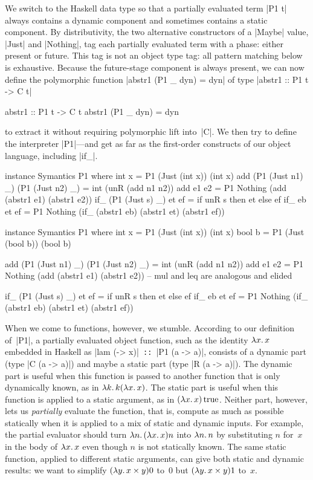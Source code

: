 We switch to the Haskell data type
\ifshort {} \else {} \fi
so that a partially evaluated term |P1 t| always contains a dynamic
component and sometimes contains a static component.  By 
distributivity, the two
alternative constructors of a |Maybe| value, |Just| and |Nothing|,
tag each partially evaluated term with a phase: either present or
future.  This tag is not an object type tag: all pattern matching below
is exhaustive.  Because the future-stage component is always present, we
can now define the polymorphic function
\ifshort
|abstr1 (P1 _ dyn) = dyn| of type
|abstr1 :: P1 t -> C t|
\else
\begin{code}
abstr1 :: P1 t -> C t
abstr1 (P1 _ dyn) = dyn
\end{code}
\fi
to extract it without requiring polymorphic lift into~|C|.  We then try
to define the interpreter |P1|---and get as far as the first-order
constructs of our object language, including |if_|.
\ifshort
\vspace*{-0.7em}
\begin{code3}
instance Symantics P1 where
  int x = P1 (Just (int x)) (int x)
  add (P1 (Just n1) _) (P1 (Just n2) _) = int (unR (add n1 n2))
  add e1 e2 = P1 Nothing (add (abstr1 e1) (abstr1 e2))
  if_ (P1 (Just s) _) et ef = if unR s then et else ef
  if_ eb et ef = P1 Nothing (if_ (abstr1 eb) (abstr1 et) (abstr1 ef))
\end{code3}
\vspace*{-0.7em}
\else
\begin{code}
instance Symantics P1 where
  int  x = P1 (Just (int  x)) (int  x)
  bool b = P1 (Just (bool b)) (bool b)

  add (P1 (Just n1) _) (P1 (Just n2) _) = int (unR (add n1 n2))
  add e1 e2 = P1 Nothing (add (abstr1 e1) (abstr1 e2))
  -- mul and leq are analogous and elided

  if_ (P1 (Just s) _) et ef = if unR s then et else ef
  if_ eb et ef = P1 Nothing
                    (if_ (abstr1 eb) (abstr1 et) (abstr1 ef))
\end{code}
\fi
When we come to functions, however, we stumble.  According to our
definition of~|P1|, a partially evaluated object function, such as the
identity $\mathopen{\lambda\mathord{x}.\,}x$ embedded in Haskell as |lam (\x -> x)|\texttt{ ::
}|P1 (a -> a)|, consists of a dynamic part (type |C (a -> a)|) and
maybe a static part (type |R (a -> a)|).  The dynamic part is useful
when this function is passed to another function that is only
dynamically known, as in $\mathopen{\lambda\mathord{k}.\,}k(\mathopen{\lambda\mathord{x}.\,}x)$.  The static part is
useful when this function is applied to a static argument, as in
$(\mathopen{\lambda\mathord{x}.\,}x)\mathinner{\mathrm{true}}$.  Neither part, however, lets us \emph{partially}
evaluate the function, that is, compute as much as possible statically
when it is applied to a mix of static and dynamic inputs.  For example,
the partial evaluator should turn $\mathopen{\lambda\mathord{n}.\,}(\mathopen{\lambda\mathord{x}.\,}x)n$ into $\mathopen{\lambda\mathord{n}.\,}n$
by substituting $n$ for~$x$ in the body of $\mathopen{\lambda\mathord{x}.\,}x$ even though $n$ is
not statically known.  The same static function, applied to
different static arguments, can give both static and dynamic results: we
want to simplify $(\mathopen{\lambda\mathord{y}.\,}x\times y)0$ to~$0$ but $(\mathopen{\lambda\mathord{y}.\,}x\times y)1$
to~$x$.

